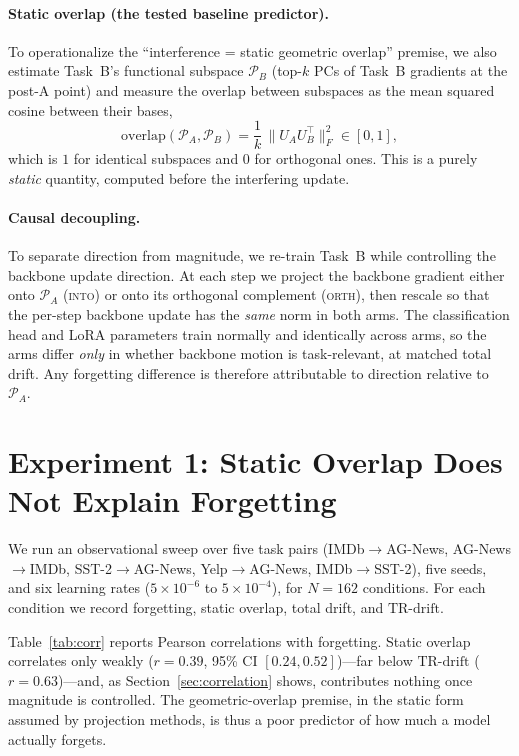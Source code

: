 \documentclass[11pt]{article}
\newcommand{\trdrift}{\mathrm{TR\text{-}drift}}
\newcommand{\PA}{\mathcal{P}_A}
\begin{document}
\paragraph{Static overlap (the tested baseline predictor).}
To operationalize the ``interference = static geometric overlap'' premise, we
also estimate Task~B's functional subspace $\mathcal{P}_B$ (top-$k$ PCs of
Task~B gradients at the post-A point) and measure the overlap between
subspaces as the mean squared cosine between their bases,
\begin{equation}
\mathrm{overlap}(\PA,\mathcal{P}_B) = \frac{1}{k}\,\big\lVert U_A U_B^\top \big\rVert_F^2 \in [0,1],
\end{equation}
which is $1$ for identical subspaces and $0$ for orthogonal ones. This is a
purely \emph{static} quantity, computed before the interfering update.

\paragraph{Causal decoupling.}
To separate direction from magnitude, we re-train Task~B while controlling the
backbone update direction. At each step we project the backbone gradient either
onto $\PA$ (\textsc{into}) or onto its orthogonal complement (\textsc{orth}),
then rescale so that the per-step backbone update has the \emph{same} norm in
both arms. The classification head and LoRA parameters train normally and
identically across arms, so the arms differ \emph{only} in whether backbone
motion is task-relevant, at matched total drift. Any forgetting difference is
therefore attributable to direction relative to $\PA$.

\section{Experiment 1: Static Overlap Does Not Explain Forgetting}
\label{sec:negative}

We run an observational sweep over five task pairs
(IMDb$\to$AG-News, AG-News$\to$IMDb, SST-2$\to$AG-News, Yelp$\to$AG-News,
IMDb$\to$SST-2), five seeds, and six learning rates
($5\!\times\!10^{-6}$ to $5\!\times\!10^{-4}$), for $N=162$ conditions. For each
condition we record forgetting, static overlap, total drift, and $\trdrift$.

Table~\ref{tab:corr} reports Pearson correlations with forgetting. Static
overlap correlates only weakly ($r=0.39$, 95\% CI $[0.24, 0.52]$)---far below
$\trdrift$ ($r=0.63$)---and, as Section~\ref{sec:correlation} shows, contributes
nothing once magnitude is controlled. The geometric-overlap premise, in the
static form assumed by projection methods, is thus a poor predictor of how much
a model actually forgets.
\end{document}
